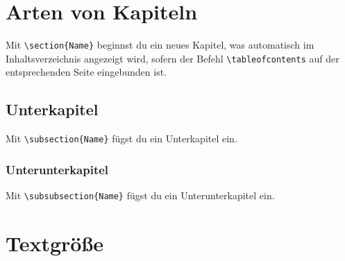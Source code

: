 \documentclass[12pt, a4paper]{article} %
\begin{document}
\section{Arten von Kapiteln}

Mit \verb|\section{Name}| beginnst du ein neues Kapitel, was automatisch im Inhaltsverzeichnis angezeigt wird, sofern der Befehl \verb|\tableofcontents| auf der entsprechenden Seite eingebunden ist.

\subsection{Unterkapitel}

Mit \verb|\subsection{Name}| f\"ugst du ein Unterkapitel ein.

\subsubsection{Unterunterkapitel}

Mit \verb|\subsubsection{Name}| f\"ugst du ein Unterunterkapitel ein.

\section{Textgr\"o\ss e}



\end{document}
